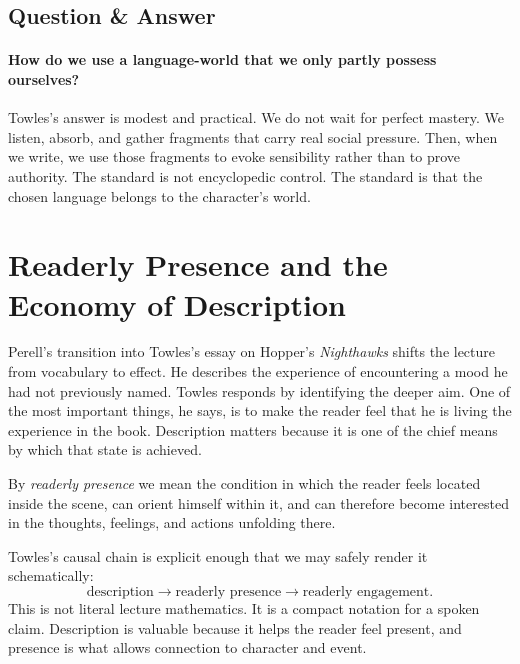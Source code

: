\subsection{Question \& Answer}

\paragraph{How do we use a language-world that we only partly possess ourselves?}

Towles's answer is modest and practical. We do not wait for perfect mastery. We listen, absorb, and gather fragments that carry real social pressure. Then, when we write, we use those fragments to evoke sensibility rather than to prove authority. The standard is not encyclopedic control. The standard is that the chosen language belongs to the character's world.

\section{Readerly Presence and the Economy of Description}

Perell's transition into Towles's essay on Hopper's \emph{Nighthawks} shifts the lecture from vocabulary to effect. He describes the experience of encountering a mood he had not previously named. Towles responds by identifying the deeper aim. One of the most important things, he says, is to make the reader feel that he is living the experience in the book. Description matters because it is one of the chief means by which that state is achieved.

\begin{definition}
By \emph{readerly presence} we mean the condition in which the reader feels located inside the scene, can orient himself within it, and can therefore become interested in the thoughts, feelings, and actions unfolding there.
\end{definition}

Towles's causal chain is explicit enough that we may safely render it schematically:
\begin{equation}
\text{description} \longrightarrow \text{readerly presence} \longrightarrow \text{readerly engagement}.
\end{equation}
This is not literal lecture mathematics. It is a compact notation for a spoken claim. Description is valuable because it helps the reader feel present, and presence is what allows connection to character and event.

